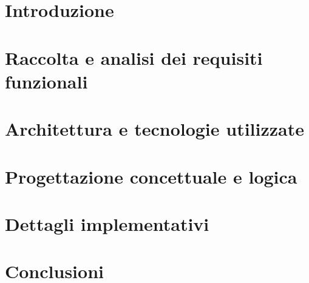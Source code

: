 \frontmatter
\maketitle
\dedication{
  Placeholder
}

\tableofcontents

\mainmatter

\chapter{Introduzione}


\chapter{Raccolta e analisi dei requisiti funzionali}


\chapter{Architettura e tecnologie utilizzate}


\chapter{Progettazione concettuale e logica}


\chapter{Dettagli implementativi}


\chapter{Conclusioni}


\backmatter
